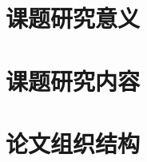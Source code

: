 \section{课题研究意义}\label{sec:课题研究意义}


\section{课题研究内容}\label{sec:课题研究内容}


\section{论文组织结构}\label{sec:论文组织结构}
